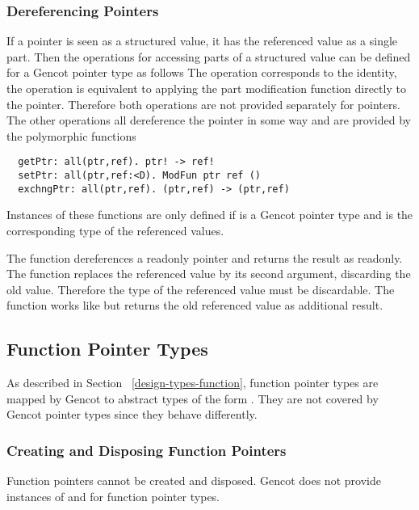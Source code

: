 \subsubsection{Dereferencing Pointers}

If a pointer is seen as a structured value, it has the referenced value as a single part.
Then the operations for accessing parts of a structured value can be defined for a Gencot pointer type as follows
The operation  corresponds to the identity, the operation  is equivalent to applying the
part modification function directly to the pointer. Therefore both operations are not provided separately for pointers. 
The other operations all dereference the pointer in some way and are provided by the polymorphic functions
\begin{verbatim}
  getPtr: all(ptr,ref). ptr! -> ref! 
  setPtr: all(ptr,ref:<D). ModFun ptr ref ()
  exchngPtr: all(ptr,ref). (ptr,ref) -> (ptr,ref)
\end{verbatim}
Instances of these functions are only defined if  is a Gencot pointer type and  is the corresponding
type of the referenced values. 

The function  dereferences a readonly pointer and returns the result as readonly. The function 
replaces the referenced value by its second argument, discarding the old value. Therefore the type  of the referenced 
value must be discardable. The function  works like
 but returns the old referenced value as additional result.

\subsection{Function Pointer Types}
\label{design-operations-function}

As described in Section ~\ref{design-types-function}, function pointer types are mapped by Gencot to abstract types of the form 
. They are not covered by Gencot pointer types since they behave differently.

\subsubsection{Creating and Disposing Function Pointers}

Function pointers cannot be created and disposed. Gencot does not provide instances of  and 
for function pointer types.

